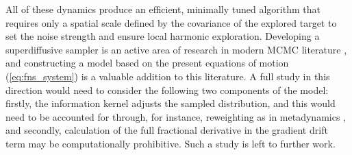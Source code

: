 All of these dynamics produce an efficient, minimally tuned algorithm that requires only a spatial scale defined by the covariance of the explored target to set the noise strength and ensure local harmonic exploration. Developing a superdiffusive sampler is an active area of research in modern MCMC literature \cite{behme_levy_2026, simsekli_fractional_nodate, ijcai2018p419}, and constructing a model based on the present equations of motion (\cref{eq:fns_system}) is a valuable addition to this literature. A full study in this direction would need to consider the following two components of the model: firstly, the information kernel adjusts the sampled distribution, and this would need to be accounted for through, for instance, reweighting as in metadynamics \cite{tiwary_time-independent_2015, bussi_using_2020, barducci_well-tempered_2008}, and secondly, calculation of the full fractional derivative in the gradient drift term may be computationally prohibitive. Such a study is left to further work.